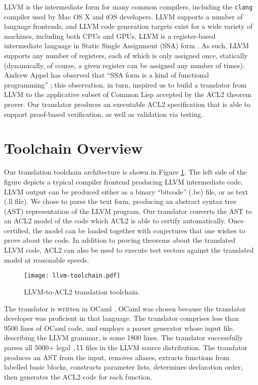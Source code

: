 \documentclass{eptcs}
\begin{document}
LLVM is the intermediate form for many common compilers, including the
\texttt{clang} compiler used by Mac OS X and iOS developers.  LLVM
supports a number of language frontends, and LLVM code generation
targets exist for a wide variety of machines, including both CPUs and
GPUs.  LLVM is a register-based intermediate language in Static Single
Assignment (SSA) form \cite{SSA}.  As such, LLVM supports any number
of registers, each of which is only assigned once, statically
(dynamically, of course, a given register can be assigned any number
of times).  Andrew Appel has observed that ``SSA form is a kind of functional
programming'' \cite{SSAfun}; this observation, in turn, inspired us to
build a translator from LLVM to the applicative subset of Common Lisp
accepted by the ACL2 theorem prover.  Our translator produces an
executable ACL2 specification that is able to support proof-based 
verification, as well as validation via testing.

\section{Toolchain Overview}

Our translation toolchain architecture is shown in Figure
\ref{toolchain}.  The left side of the figure depicts a typical
compiler frontend producing LLVM intermediate code.  LLVM output can
be produced either as a binary ``bitcode'' (.bc) file, or as text (.ll
file).  We chose to parse the text form, producing an abstract syntax
tree (AST) representation of the LLVM program.  Our translator
converts the AST to an ACL2 model of the code which ACL2 is able to
certify automatically.  Once certified, the model can be loaded
together with conjectures that one wishes to prove about the code.  In
addition to proving theorems about the translated LLVM code, ACL2 can
also be used to execute test vectors against the translated model at
reasonable speeds.

\begin{figure}
\begin{center}
\texttt{[image: llvm-toolchain.pdf]}
\end{center}
\caption{LLVM-to-ACL2 translation toolchain.}
\label{toolchain}
\end{figure}

The translator is written in OCaml \cite{OCaml}.  OCaml was chosen
because the translator developer was proficient in that language.  The
translator comprises less than 9500 lines of OCaml code, and  
employs a parser generator whose input file, describing the LLVM 
grammar, is some 1800 lines.  The translator 
successfully parses all 5000+ legal \texttt{.ll} files in
the LLVM source distribution.  The translator produces an AST from
the input, removes aliases, extracts functions from labelled basic
blocks, constructs parameter lists, determines declaration order, 
then generates the ACL2 code for each function.
\end{document}
